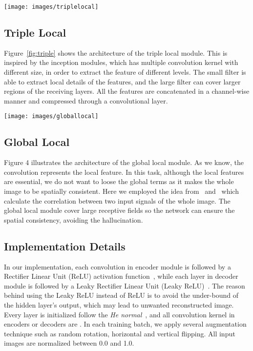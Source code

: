 \documentclass[final]{cvpr}
\begin{document}
\begin{figure*}
\begin{center}
\texttt{[image: images/triplelocal]}
\end{center}
   \caption{Triple Local Module}
\label{fig:triple}
\end{figure*}

\subsection{Triple Local}
Figure~\ref{fig:triple} shows the architecture of the triple local module. This is inspired by the inception modules, which has multiple convolution kernel with different size, in order to extract the feature of different levels. The small filter is able to extract local details of the features, and the large filter can cover larger regions of the receiving layers. All the features are concatenated in a channel-wise manner and compressed through a convolutional layer.


\begin{figure*}
\begin{center}
\texttt{[image: images/globallocal]}
\end{center}
   \caption{Global Local Module}
\label{fig:short}
\end{figure*}

\subsection{Global Local}
Figure 4 illustrates the architecture of the global local module. As we know, the convolution represents the local feature. In this task, although the local features are essential, we do not want to loose the global terms as it makes the whole image to be spatially consistent. Here we employed the idea from~\cite{wang} and~\cite{buades} which calculate the correlation between two input signals of the whole image. The global local module cover large receptive fields so the network can ensure the spatial consistency, avoiding the hallucination.

\subsection{Implementation Details}
In our implementation, each convolution in encoder module is followed by a Rectifier Linear Unit (ReLU) activation function~\cite{relu}, while each layer in decoder module is followed by a Leaky Rectifier Linear Unit (Leaky ReLU)~\cite{leakyrelu}. The reason behind using the Leaky ReLU instead of ReLU is to avoid the under-bound of the hidden layer's output, which may lead to unwanted reconstructed image. Every layer is initialized follow the \textit{He normal}~\cite{henormal}, and all convolution kernel in encoders or decoders are  . In each training batch, we apply several augmentation technique such as random rotation, horizontal and vertical flipping. All input images are normalized between 0.0 and 1.0. 
\end{document}

